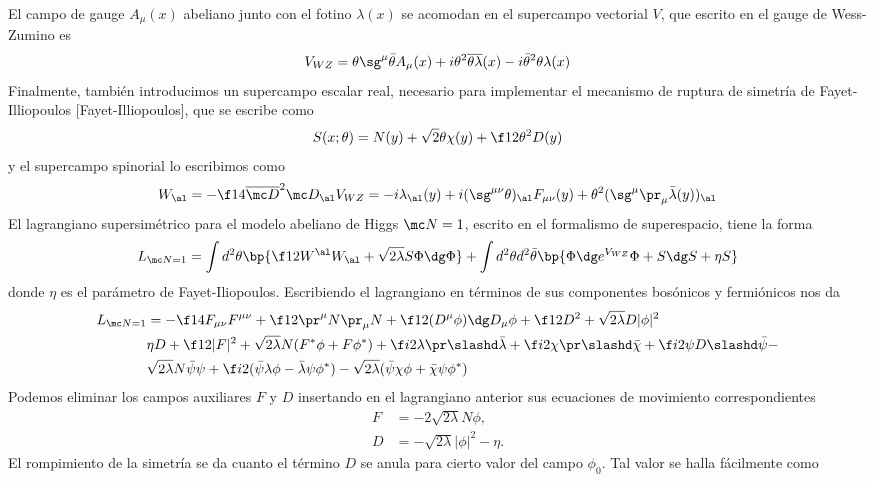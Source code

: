 El campo de gauge $A_\mu(x)$ abeliano junto con el fotino $\lambda(x)$ se acomodan en el supercampo vectorial $V$, que escrito en el gauge de Wess-Zumino es
\begin{align}
	V_{WZ} = \theta\sg^\mu\bar\theta A_\mu(x)+i\theta^2\overline{\theta\lambda}(x)-i\bar\theta^2\theta\lambda(x)
\end{align}
Finalmente, también introducimos un supercampo escalar real, necesario para implementar el mecanismo de ruptura de simetría de Fayet-Illiopoulos [Fayet-Illiopoulos], que se escribe como
\begin{align}
	S(x;\theta) = N(y)+\sqrt 2\theta\chi(y)+\f 12\theta^2 D(y)
\end{align}
y el supercampo spinorial lo escribimos como
\begin{align}
	W_\al = -\f 14 \overline{\mc D}^2\mc D_\al V_{WZ} = -i\lambda_\al(y)+i(\sg^{\mu\nu}\theta)_\al F_{\mu\nu}(y)+\theta^2(\sg^\mu\pr_\mu\bar\lambda(y))_\al
\end{align}
El lagrangiano supersimétrico para el modelo abeliano de Higgs $\mc N=1$, escrito en el formalismo de superespacio, tiene la forma
\begin{align}
	L_{\mc N=1} = \int d^2\theta\bp{\f 12 W^\al W_\al+\sqrt{2\lambda}S\Phi\dg\Phi}+\int d^2\theta d^2\bar\theta \bp{\Phi\dg e^{V_{WZ}}\Phi+S\dg S+\eta S}
\end{align}
donde $\eta$ es el parámetro de Fayet-Iliopoulos. Escribiendo el lagrangiano en términos de sus componentes bosónicos y fermiónicos nos da
\begin{align}
	L_{\mc N=1} &= -\f 14 F_{\mu\nu}F^{\mu\nu}+\f 12\pr^\mu N\pr_\mu N+\f 12(D^\mu\phi)\dg D_\mu\phi+\f 12D^2+\sqrt{2\lambda} D|\phi|^2 \nonumber\\
	&\eta D+\f 12|F|^2+\sqrt{2\lambda}N(F^*\phi+F\phi^*)+\f i2\lambda\pr\slashd\bar\lambda+\f i2\chi\pr\slashd\bar\chi+\f i2\psi D\slashd\bar\psi-\nonumber\\
	&\sqrt{2\lambda}N\bar\psi\psi+\f i2(\bar\psi\lambda\phi-\bar\lambda\psi\phi^*)-\sqrt{2\lambda}(\bar\psi\chi\phi+\bar\chi\psi\phi^*) \label{eq:5.2.0.11}
\end{align}
Podemos eliminar los campos auxiliares $F$ y $D$ insertando en el lagrangiano anterior sus ecuaciones de movimiento correspondientes
\begin{align}
	F &= -2\sqrt{2\lambda} N\phi,\\
	D &= -\sqrt{2\lambda}|\phi|^2-\eta.
\end{align}
El rompimiento de la simetría se da cuanto el término $D$ se anula para cierto valor del campo $\phi_0$. Tal valor se halla fácilmente como

